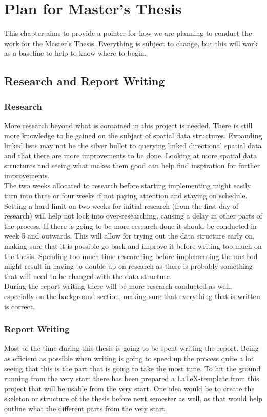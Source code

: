 \chapter{Plan for Master's Thesis}
This chapter aims to provide a pointer for how we are planning to conduct the work for the Master's Thesis. Everything is subject to change, but this will work as a baseline to help to know where to begin.
\section{Research and Report Writing}
\subsection{Research}
More research beyond what is contained in this project is needed. There is still more knowledge to be gained on the subject of spatial data structures. Expanding linked lists may not be the silver bullet to querying linked directional spatial data and that there are more improvements to be done. Looking at more spatial data structures and seeing what makes them good can help find inspiration for further improvements. \\

The two weeks allocated to research before starting implementing might easily turn into three or four weeks if not paying attention and staying on schedule. Setting a hard limit on two weeks for initial research (from the first day of research) will help not lock into over-researching, causing a delay in other parts of the process. If there is going to be more research done it should be conducted in week 5 and outwards. This will allow for trying out the data structure early on, making sure that it is possible go back and improve it before writing too much on the thesis. Spending too much time researching before implementing the method might result in having to double up on research as there is probably something that will need to be changed with the data structure. \\

During the report writing there will be more research conducted as well, especially on the background section, making sure that everything that is written is correct.
\subsection{Report Writing}
Most of the time during this thesis is going to be spent writing the report. Being as efficient as possible when writing is going to speed up the process quite a lot seeing that this is the part that is going to take the most time. To hit the ground running from the very start there has been prepared a \LaTeX-template from this project that will be usable from the very start. One idea would be to create the skeleton or structure of the thesis before next semester as well, as that would help outline what the different parts from the very start. \\

